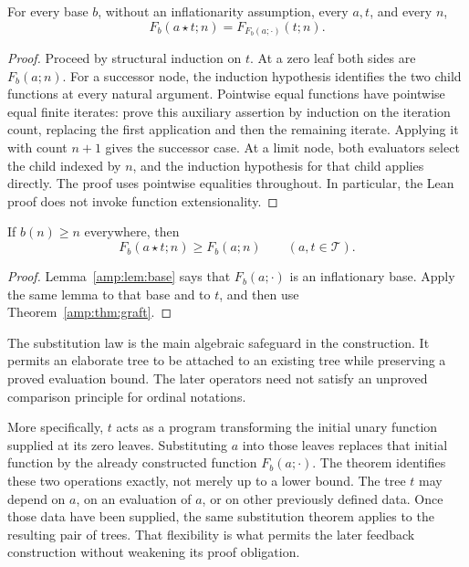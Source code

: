 \begin{theorem}
\label{amp:thm:graft}
For every base $b$, without an inflationarity assumption, every $a,t$, and
every $n$,
\[
 F_b(a\star t;n)=F_{F_b(a;\mathord\cdot)}(t;n).
\]
\end{theorem}

\begin{proof}
Proceed by structural induction on $t$.  At a zero leaf both sides are
$F_b(a;n)$.  For a successor node, the induction hypothesis identifies the
two child functions at every natural argument.  Pointwise equal functions
have pointwise equal finite iterates: prove this auxiliary assertion by
induction on the iteration count, replacing the first application and then
the remaining iterate.  Applying it with count $n+1$ gives the successor
case.  At a limit node, both evaluators select the child indexed by $n$, and
the induction hypothesis for that child applies directly.  The proof uses
pointwise equalities throughout.  In particular, the Lean proof does not
invoke function extensionality.
\end{proof}

\begin{proposition}
\label{amp:cor:graftlower}
If $b(n)\geq n$ everywhere, then
\[
 F_b(a\star t;n)\geq F_b(a;n)
 \qquad(a,t\in\mathcal T).
\]
\end{proposition}

\begin{proof}
Lemma~\ref{amp:lem:base} says that $F_b(a;\mathord\cdot)$ is an inflationary
base.  Apply the same lemma to that base and to $t$, and then use
Theorem~\ref{amp:thm:graft}.
\end{proof}

The substitution law is the main algebraic safeguard in the construction.
It permits an elaborate tree to be attached to an existing tree while
preserving a proved evaluation bound.  The later operators need not satisfy
an unproved comparison principle for ordinal notations.

More specifically, $t$ acts as a program transforming the initial unary
function supplied at its zero leaves.  Substituting $a$ into those leaves
replaces that initial function by the already constructed function
$F_b(a;\mathord\cdot)$.  The theorem identifies these two operations exactly,
not merely up to a lower bound.  The tree $t$ may depend on $a$, on an
evaluation of $a$, or on other previously defined data.  Once those data
have been supplied, the same substitution theorem applies to the resulting
pair of trees.  That flexibility is what permits the later feedback
construction without weakening its proof obligation.


